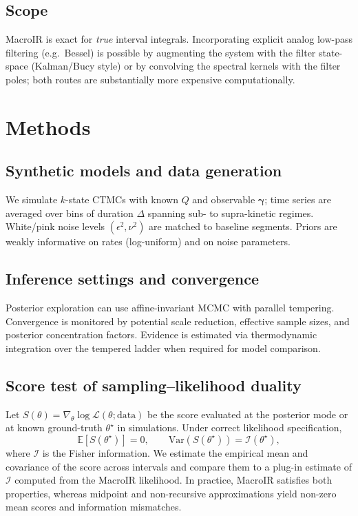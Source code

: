 \documentclass[9pt]{elife}
\begin{document}
\subsection*{Scope}
MacroIR is exact for \emph{true} interval integrals. Incorporating explicit analog low-pass filtering (e.g.\ Bessel) is possible by augmenting the system with the filter state-space (Kalman/Bucy style) or by convolving the spectral kernels with the filter poles; both routes are substantially more expensive computationally.


\section*{Methods}
\subsection*{Synthetic models and data generation}
We simulate $k$-state CTMCs with known $Q$ and observable $\bm{\gamma}$; time series are averaged over bins of duration $\Delta$ spanning sub- to supra-kinetic regimes. White/pink noise levels $(\epsilon^2,\nu^2)$ are matched to baseline segments. Priors are weakly informative on rates (log-uniform) and on noise parameters.

\subsection*{Inference settings and convergence}
Posterior exploration can use affine-invariant MCMC with parallel tempering. Convergence is monitored by potential scale reduction, effective sample sizes, and posterior concentration factors. Evidence is estimated via thermodynamic integration over the tempered ladder when required for model comparison.

\subsection*{Score test of sampling--likelihood duality}
Let $S(\theta)=\nabla_\theta \log \mathcal{L}(\theta;\text{data})$ be the score evaluated at the posterior mode or at known ground-truth $\theta^\star$ in simulations. Under correct likelihood specification,
\begin{equation}
\mathbb{E}[S(\theta^\star)] = 0, \qquad \mathrm{Var}(S(\theta^\star)) = \mathcal{I}(\theta^\star),
\end{equation}
where $\mathcal{I}$ is the Fisher information. We estimate the empirical mean and covariance of the score across intervals and compare them to a plug-in estimate of $\mathcal{I}$ computed from the MacroIR likelihood. In practice, MacroIR satisfies both properties, whereas midpoint and non-recursive approximations yield non-zero mean scores and information mismatches.
\end{document}

